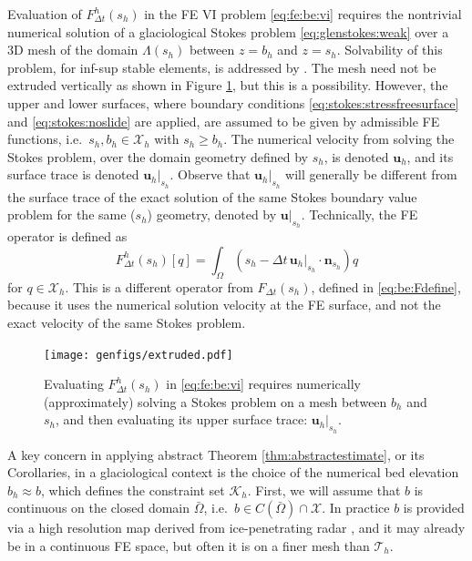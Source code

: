 \documentclass[hidelinks,onefignum,onetabnum,final]{siamart220329}  %
\newcommand{\bn}{\mathbf{n}}
\newcommand{\bu}{\mathbf{u}}
\newcommand{\cK}{\mathcal{K}}
\newcommand{\cT}{\mathcal{T}}
\newcommand{\cX}{\mathcal{X}}
\begin{document}
Evaluation of $F^h_{\Delta t}(s_h)$ in the FE VI problem \eqref{eq:fe:be:vi} requires the nontrivial numerical solution of a glaciological Stokes problem \eqref{eq:glenstokes:weak} over a 3D mesh of the domain $\Lambda(s_h)$ between $z=b_h$ and $z=s_h$.  Solvability of this problem, for inf-sup stable elements, is addressed by \cite{Belenkietal2012,JouvetRappaz2011}.  The mesh need not be extruded vertically as shown in Figure \ref{fig:fe:operatorvisualization}, but this is a possibility.  However, the upper and lower surfaces, where boundary conditions \eqref{eq:stokes:stressfreesurface} and \eqref{eq:stokes:noslide} are applied, are assumed to be given by admissible FE functions, i.e.~$s_h,b_h\in\cX_h$ with $s_h\ge b_h$.  The numerical velocity from solving the Stokes problem, over the domain geometry defined by $s_h$, is denoted $\bu_h$, and its surface trace is denoted $\bu_h|_{s_h}$.  Observe that $\bu_h|_{s_h}$ will generally be different from the surface trace of the exact solution of the same Stokes boundary value problem for the same ($s_h$) geometry, denoted by $\bu|_{s_h}$.  Technically, the FE operator is defined as
\begin{equation}
F_{\Delta t}^h(s_h)[q] = \int_\Omega \left(s_h - \Delta t\, \bu_h|_{s_h}\cdot \bn_{s_h}\right) q
\label{eq:fe:be:Fdefine}
\end{equation}
for $q\in\cX_h$.  This is a different operator from $F_{\Delta t}(s_h)$, defined in \eqref{eq:be:Fdefine}, because it uses the numerical solution velocity at the FE surface, and not the exact velocity of the same Stokes problem.

\begin{figure}[ht]
\begin{center}
\texttt{[image: genfigs/extruded.pdf]}
\end{center}
\caption{Evaluating $F^h_{\Delta t}(s_h)$ in \eqref{eq:fe:be:vi} requires numerically (approximately) solving a Stokes problem on a mesh between $b_h$ and $s_h$, and then evaluating its upper surface trace: $\bu_h|_{s_h}$.}
\label{fig:fe:operatorvisualization}
\end{figure}

A key concern in applying abstract Theorem \ref{thm:abstractestimate}, or its Corollaries, in a glaciological context is the choice of the numerical bed elevation $b_h \approx b$, which defines the constraint set $\cK_h$.  First, we will assume that $b$ is continuous on the closed domain $\bar\Omega$, i.e.~$b\in C(\bar\Omega) \cap \cX$.  In practice $b$ is provided via a high resolution map derived from ice-penetrating radar \cite{Morlighemetal2017}, and it may already be in a continuous FE space, but often it is on a finer mesh than $\cT_h$.
\end{document}
